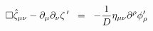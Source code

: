 \begin{equation}
\square {\hat{\zeta}}_{\mu\nu} - \partial_{\mu} \partial_{\nu} \zeta^{\, 
\prime} \;\; =\;\;
-{1 \over D} \eta_{\mu\nu} \partial^{\rho} \phi^{\prime}_{\rho}
\label{eq:b9}
\end{equation}

